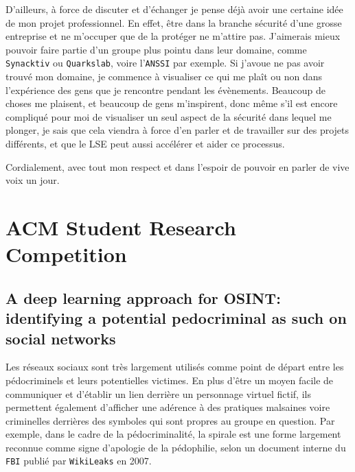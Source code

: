 \documentclass[a4paper, 11pt]{article}
\begin{document}
    D’ailleurs, à force de discuter et d’échanger je pense déjà avoir une certaine idée de mon projet professionnel. En effet, être dans la branche sécurité d’une grosse entreprise et ne m’occuper que de la protéger ne m’attire pas. J’aimerais mieux pouvoir faire partie d’un groupe plus pointu dans leur domaine, comme \texttt{Synacktiv} ou \texttt{Quarkslab}, voire l’\texttt{ANSSI} par exemple. Si j’avoue ne pas avoir trouvé mon domaine, je commence à visualiser ce qui me plaît ou non dans l'expérience des gens que je rencontre pendant les évènements. Beaucoup de choses me plaisent, et beaucoup de gens m’inspirent, donc même s’il est encore compliqué pour moi de visualiser un seul aspect de la sécurité dans lequel me plonger, je sais que cela viendra à force d’en parler et de travailler sur des projets différents, et que le LSE peut aussi accélérer et aider ce processus.

    Cordialement, avec tout mon respect et dans l’espoir de pouvoir en parler de vive voix un jour.

\section*{ACM Student Research Competition}

    \subsection*{A deep learning approach for OSINT: identifying a potential pedocriminal as such on social networks}

        Les réseaux sociaux sont très largement utilisés comme point de départ entre les pédocriminels et leurs potentielles victimes. En plus d'être un moyen facile de communiquer et d'établir un lien derrière un personnage virtuel fictif, ils permettent également d'afficher une adérence à des pratiques malsaines voire criminelles derrières des symboles qui sont propres au groupe en question. Par exemple, dans le cadre de la pédocriminalité, la spirale est une forme largement reconnue comme signe d'apologie de la pédophilie, selon un document interne du \texttt{FBI} publié par \texttt{WikiLeaks} en 2007.
\end{document}
